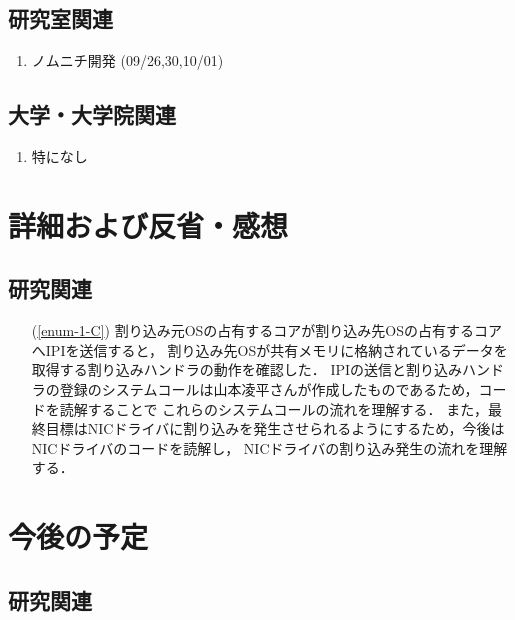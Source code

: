 \documentclass[fleqn, 14pt]{extarticle}
\begin{document}
\subsection{研究室関連}
\label{sec-2-2}
\begin{enumerate}
\item ノムニチ開発
\hfill
\label{enum-lab1}
(09/26,30,10/01)
\end{enumerate}
\subsection{大学・大学院関連}
\label{sec-2-3}

\begin{enumerate}
\item 特になし
\hfill
\label{enum-univ2}
\end{enumerate}





\section{詳細および反省・感想}
\label{sec-3}
\subsection{研究関連}
\label{sec-3-1}

\begin{itemize}
\item[(\ref{enum-1-C})]
割り込み元OSの占有するコアが割り込み先OSの占有するコアへIPIを送信すると，
割り込み先OSが共有メモリに格納されているデータを取得する割り込みハンドラの動作を確認した．
IPIの送信と割り込みハンドラの登録のシステムコールは山本凌平さんが作成したものであるため，コードを読解することで
これらのシステムコールの流れを理解する．
また，最終目標はNICドライバに割り込みを発生させられるようにするため，今後はNICドライバのコードを読解し，
NICドライバの割り込み発生の流れを理解する．
\end{itemize}

\section{今後の予定}
\label{sec-4}
\subsection{研究関連}
\label{sec-4-1}
\end{document}
